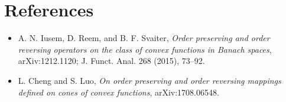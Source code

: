 \documentclass[11pt]{article}
\begin{document}
\section*{References}

\begin{itemize}
\item A. N. Iusem, D. Reem, and B. F. Svaiter, \emph{Order preserving and order
reversing operators on the class of convex functions in Banach spaces},
arXiv:1212.1120; J. Funct. Anal. 268 (2015), 73--92.
\item L. Cheng and S. Luo, \emph{On order preserving and order reversing
mappings defined on cones of convex functions}, arXiv:1708.06548.
\end{itemize}
\end{document}
